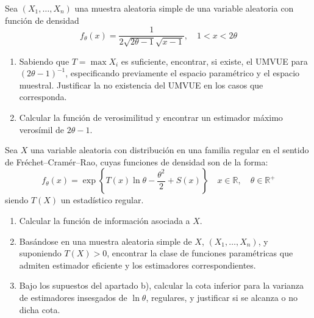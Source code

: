 \documentclass[12pt]{article}
\newcommand{\R}{\mathbb{R}}
\newcommand{\Rmas}{\R^{+}}
\begin{document}
    \begin{ejercicio}[2,25 puntos]
        Sea $(X_1,\dots,X_n)$ una muestra aleatoria simple de una variable aleatoria con función
        de densidad $$f_\theta(x)=\dfrac{1}{2\sqrt{2\theta-1}\sqrt{x-1}}, \quad 1<x<2\theta$$

        \begin{enumerate}
            \item[a)] Sabiendo que $T=\max X_i$ es suficiente, encontrar, si existe, el UMVUE para
            $(2\theta-1)^{-1}$, especificando previamente el espacio paramétrico y el espacio
            muestral. Justificar la no existencia del UMVUE en los casos que corresponda.

            \item[b)] Calcular la función de verosimilitud y encontrar un estimador máximo
            verosímil de $2\theta-1$.
        \end{enumerate}
    \end{ejercicio}

    \begin{ejercicio}[2 puntos]
        Sea $X$ una variable aleatoria con distribución en una familia regular en el sentido
        de Fréchet--Cramér--Rao, cuyas funciones de densidad son de la forma:
        $$f_\theta(x)=\exp \left\{T(x)\ln\theta-\dfrac{\theta^2}{2}+S(x)\right\} \quad x\in\R, \quad \theta\in\Rmas$$
        siendo $T(X)$ un estadístico regular.

        \begin{enumerate}
        \item[a)] Calcular la función de información asociada a $X$.

        \item[b)] Basándose en una muestra aleatoria simple de $X$, $(X_1,\dots,X_n)$, y
        suponiendo $T(X)>0$, encontrar la clase de funciones paramétricas que admiten
        estimador eficiente y los estimadores correspondientes.

        \item[c)] Bajo los supuestos del apartado b), calcular la cota inferior para la varianza
        de estimadores insesgados de $\ln\theta$, regulares, y justificar si se alcanza o no
        dicha cota.
        \end{enumerate}
    \end{ejercicio}

    \newpage
\end{document}
